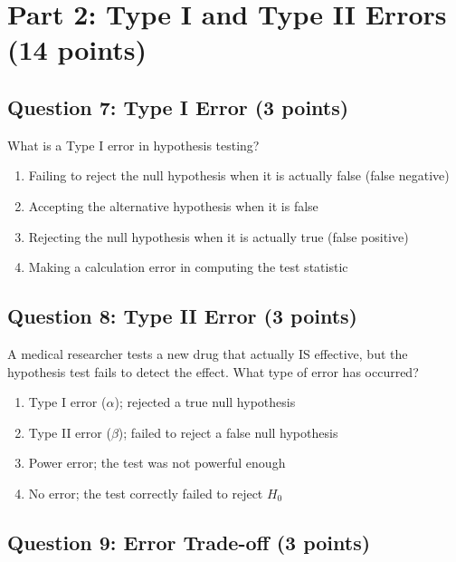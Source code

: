 \documentclass[11pt]{article}
\begin{document}
\section{Part 2: Type I and Type II Errors (14 points)}

\subsection*{Question 7: Type I Error (3 points)}

What is a Type I error in hypothesis testing?

\begin{enumerate}[label=\Alph*)]
\item Failing to reject the null hypothesis when it is actually false (false negative)
\item Accepting the alternative hypothesis when it is false
\item Rejecting the null hypothesis when it is actually true (false positive)
\item Making a calculation error in computing the test statistic
\end{enumerate}

\vspace{0.5cm}

\subsection*{Question 8: Type II Error (3 points)}

A medical researcher tests a new drug that actually IS effective, but the hypothesis test fails to detect the effect. What type of error has occurred?

\begin{enumerate}[label=\Alph*)]
\item Type I error ($\alpha$); rejected a true null hypothesis
\item Type II error ($\beta$); failed to reject a false null hypothesis
\item Power error; the test was not powerful enough
\item No error; the test correctly failed to reject $H_0$
\end{enumerate}

\vspace{0.5cm}

\subsection*{Question 9: Error Trade-off (3 points)}
\end{document}

